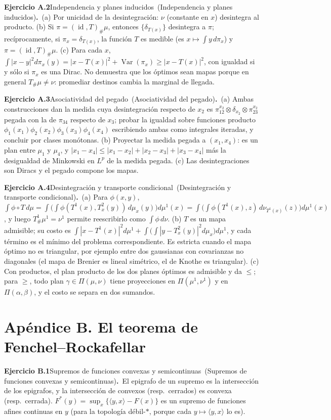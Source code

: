 \documentclass[11pt,a4paper]{amsart}
\newcommand{\id}{\operatorname{id}}
\theoremstyle{remark}
\theoremstyle{definition}
\numberwithin{subsection}{section}
\numberwithin{equation}{section}
\newcommand{\ejlabel}[2]{\par\medskip\noindent\textbf{Ejercicio #1}\ifx\relax#2\relax\else\ (#2)\fi\textbf{.}\ }
\begin{document}
\ejlabel{A.2}{Independencia y planes inducidos}(a) Por unicidad de la desintegración: $\nu$ (constante en $x$) desintegra al producto. (b) Si $\pi=(\id,T)_\#\mu$, entonces $\{\delta_{T(x)}\}$ desintegra a $\pi$; recíprocamente, si $\pi_x=\delta_{T(x)}$, la función $T$ es medible (es $x\mapsto\int y\,d\pi_x$) y $\pi=(\id,T)_\#\mu$. (c) Para cada $x$, $\int|x-y|^2d\pi_x(y)=|x-T(x)|^2+\operatorname{Var}(\pi_x)\ge|x-T(x)|^2$, con igualdad si y sólo si $\pi_x$ es una Dirac. No demuestra que los óptimos sean mapas porque en general $T_\#\mu\ne\nu$: promediar destinos cambia la marginal de llegada.

\ejlabel{A.3}{Asociatividad del pegado}(a) Ambas construcciones dan la medida cuya desintegración respecto de $x_2$ es $\pi_{12}^{x_2}\otimes\delta_{x_2}\otimes\pi_{23}^{x_2}$ pegada con la de $\pi_{34}$ respecto de $x_3$; probar la igualdad sobre funciones producto $\phi_1(x_1)\phi_2(x_2)\phi_3(x_3)\phi_4(x_4)$ escribiendo ambas como integrales iteradas, y concluir por clases monótonas. (b) Proyectar la medida pegada a $(x_1,x_4)$: es un plan entre $\mu_1$ y $\mu_4$, y $|x_1-x_4|\le|x_1-x_2|+|x_2-x_3|+|x_3-x_4|$ más la desigualdad de Minkowski en $L^p$ de la medida pegada. (c) Las desintegraciones son Diracs y el pegado compone los mapas.

\ejlabel{A.4}{Desintegración y transporte condicional}(a) Para $\phi(x,y)$, $\int\phi\circ T\,d\mu=\int\bigl(\int\phi(T^1(x),T^2_x(y))\,d\mu_x(y)\bigr)d\mu^1(x)=\int\bigl(\int\phi(T^1(x),z)\,d\nu_{T^1(x)}(z)\bigr)d\mu^1(x)$, y luego $T^1_\#\mu^1=\nu^1$ permite reescribirlo como $\int\phi\,d\nu$. (b) $T$ es un mapa admisible; su costo es $\int|x-T^1(x)|^2d\mu^1+\int\bigl(\int|y-T^2_x(y)|^2d\mu_x\bigr)d\mu^1$, y cada término es el mínimo del problema correspondiente. Es estricta cuando el mapa óptimo no es triangular, por ejemplo entre dos gaussianas con covarianzas no diagonales (el mapa de Brenier es lineal simétrico, el de Knothe es triangular). (c) Con productos, el plan producto de los dos planes óptimos es admisible y da $\le$; para $\ge$, todo plan $\gamma\in\Pi(\mu,\nu)$ tiene proyecciones en $\Pi(\mu^1,\nu^1)$ y en $\Pi(\alpha,\beta)$, y el costo se separa en dos sumandos.

\section*{Apéndice B. El teorema de Fenchel--Rockafellar}
\ejlabel{B.1}{Supremos de funciones convexas y semicontinuas}El epigrafo de un supremo es la intersección de los epigrafos, y la intersección de convexos (resp.\ cerrados) es convexa (resp.\ cerrada). $F^*(y)=\sup_x\{\langle y,x\rangle-F(x)\}$ es un supremo de funciones afines continuas en $y$ (para la topología débil-$*$, porque cada $y\mapsto\langle y,x\rangle$ lo es).
\end{document}
